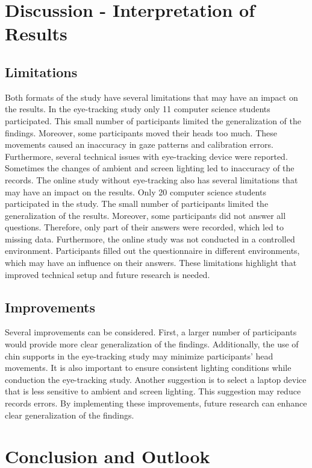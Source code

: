 \chapter{Discussion - Interpretation of Results}

\section{Limitations} 
Both formats of the study have several limitations that may have an impact on the results.
In the eye-tracking study only 11 computer science students participated.  This small number of participants limited the generalization of the findings.  Moreover, some participants moved their heads too much.  These movements caused an inaccuracy in gaze patterns and calibration errors. Furthermore, several technical issues with eye-tracking device were reported. Sometimes the changes of ambient and screen lighting led to inaccuracy of the records.
The online study without eye-tracking also has several limitations that may have an impact on the results. 
Only 20 computer science students participated in the study. The small number of participants limited the generalization of the results. 
Moreover, some participants did not answer all questions. Therefore, only part of their answers were recorded, which led to missing data. 
Furthermore, the online study was not conducted in a controlled environment. Participants filled out the questionnaire in different environments, which may have an influence on their answers.  
These limitations highlight that improved technical setup and future research is needed. 


\section{Improvements}

Several improvements can be considered. First, a larger number of participants would provide more clear generalization of the findings. Additionally, the use of chin supports in the eye-tracking study may minimize participants’ head movements. It is also important to ensure consistent lighting conditions while conduction the eye-tracking study. Another suggestion is to select a laptop device that is less sensitive to ambient and screen lighting. This suggestion may reduce records errors. By implementing these improvements, future research can enhance clear generalization of the findings. 

\chapter{Conclusion and Outlook}
\label{sec:conclusion}
